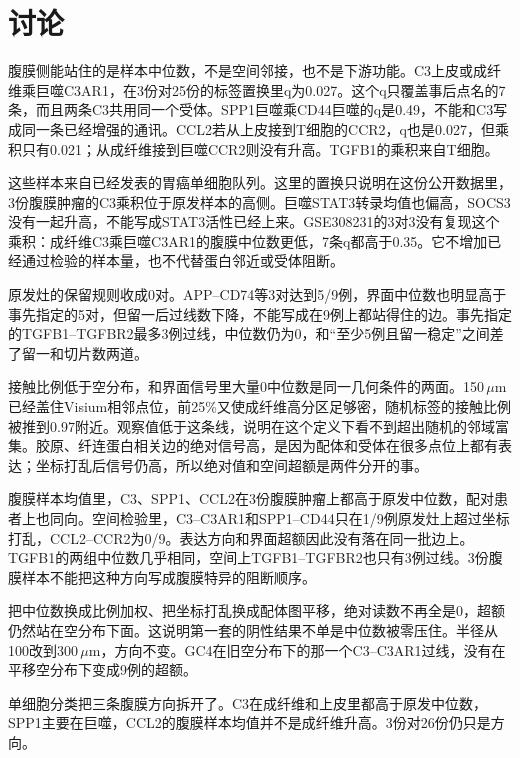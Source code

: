 \section{讨论}
\label{sec:discussion}

腹膜侧能站住的是样本中位数，不是空间邻接，也不是下游功能。C3上皮或成纤维乘巨噬C3AR1，在3份对25份的标签置换里q为0.027。这个q只覆盖事后点名的7条，而且两条C3共用同一个受体。SPP1巨噬乘CD44巨噬的q是0.49，不能和C3写成同一条已经增强的通讯。CCL2若从上皮接到T细胞的CCR2，q也是0.027，但乘积只有0.021；从成纤维接到巨噬CCR2则没有升高。TGFB1的乘积来自T细胞。

这些样本来自已经发表的胃癌单细胞队列。这里的置换只说明在这份公开数据里，3份腹膜肿瘤的C3乘积位于原发样本的高侧。巨噬STAT3转录均值也偏高，SOCS3没有一起升高，不能写成STAT3活性已经上来。GSE308231的3对3没有复现这个乘积：成纤维C3乘巨噬C3AR1的腹膜中位数更低，7条q都高于0.35。它不增加已经通过检验的样本量，也不代替蛋白邻近或受体阻断。

原发灶的保留规则收成0对。APP--CD74等3对达到5/9例，界面中位数也明显高于事先指定的5对，但留一后过线数下降，不能写成在9例上都站得住的边。事先指定的TGFB1--TGFBR2最多3例过线，中位数仍为0，和“至少5例且留一稳定”之间差了留一和切片数两道。

接触比例低于空分布，和界面信号里大量0中位数是同一几何条件的两面。150\,$\mu$m已经盖住Visium相邻点位，前25\%又使成纤维高分区足够密，随机标签的接触比例被推到0.97附近。观察值低于这条线，说明在这个定义下看不到超出随机的邻域富集。胶原、纤连蛋白相关边的绝对信号高，是因为配体和受体在很多点位上都有表达；坐标打乱后信号仍高，所以绝对值和空间超额是两件分开的事。

腹膜样本均值里，C3、SPP1、CCL2在3份腹膜肿瘤上都高于原发中位数，配对患者上也同向。空间检验里，C3--C3AR1和SPP1--CD44只在1/9例原发灶上超过坐标打乱，CCL2--CCR2为0/9。表达方向和界面超额因此没有落在同一批边上。TGFB1的两组中位数几乎相同，空间上TGFB1--TGFBR2也只有3例过线。3份腹膜样本不能把这种方向写成腹膜特异的阻断顺序。

把中位数换成比例加权、把坐标打乱换成配体图平移，绝对读数不再全是0，超额仍然站在空分布下面。这说明第一套的阴性结果不单是中位数被零压住。半径从100改到300\,$\mu$m，方向不变。GC4在旧空分布下的那一个C3--C3AR1过线，没有在平移空分布下变成9例的超额。

单细胞分类把三条腹膜方向拆开了。C3在成纤维和上皮里都高于原发中位数，SPP1主要在巨噬，CCL2的腹膜样本均值并不是成纤维升高。3份对26份仍只是方向。
